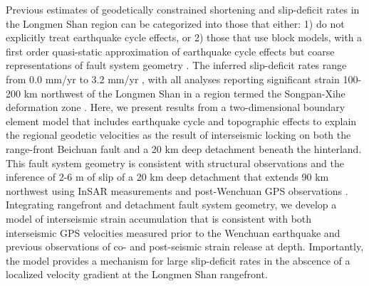 \documentclass[12pt]{article}
\begin{document}
Previous estimates of geodetically constrained shortening and slip-deficit rates in the Longmen Shan region can be categorized into those that either: 1) do not explicitly treat earthquake cycle effects, \citep{chen00, shen05, Thatcher2007} or 2) those that use block models, with a first order quasi-static approximation of earthquake cycle effects but coarse representations of fault system geometry \citep{Meade07c, Loveless2011, Burchfiel2008}. The inferred slip-deficit rates range from 0.0 mm/yr \citep{Thatcher2007} to 3.2 mm/yr \citep{Loveless2011}, with all analyses reporting significant strain 100-200 km northwest of the Longmen Shan in a region termed the Songpan-Xihe deformation zone \citep{shen05}. Here, we present results from a two-dimensional boundary element model that includes earthquake cycle and topographic effects to explain the regional geodetic velocities as the result of interseismic locking on both the range-front Beichuan fault and a 20 km deep detachment beneath the hinterland. This fault system geometry is consistent with structural observations \citep{Hubbard2010, Li2010a} and the inference of 2-6 m of slip of a 20 km deep detachment that extends 90 km northwest using InSAR measurements and post-Wenchuan GPS observations \citep{Qi2011, Fielding2013b}. Integrating rangefront and detachment fault system geometry, we develop a model of interseismic strain accumulation that is consistent with both interseismic GPS velocities measured prior to the Wenchuan earthquake and previous observations of co- and post-seismic strain release at depth. Importantly, the model provides a mechanism for large slip-deficit rates in the abscence of a localized velocity gradient at the Longmen Shan rangefront.
\end{document}
